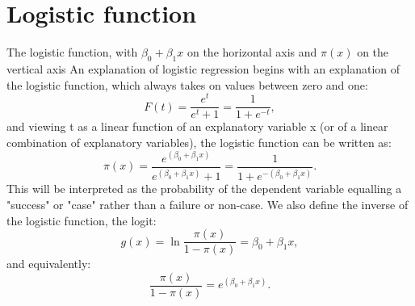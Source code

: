 \documentclass[a4paper,12pt]{article}
\begin{document}
\section*{Logistic function} 

The logistic function, with $\beta_0 + \beta_1 x$ on the horizontal axis and $\pi(x)$ on the vertical axis
An explanation of logistic regression begins with an explanation of the logistic function, which always takes on values between zero and one:
\[
F(t) = \frac{e^t}{e^t+1} = \frac{1}{1+e^{-t}},
\]
and viewing t as a linear function of an explanatory variable x (or of a linear combination of explanatory variables), the logistic function can be written as:
\[\pi(x) = \frac{e^{(\beta_0 + \beta_1 x)}} {e^{(\beta_0 + \beta_1 x)} + 1} = \frac {1} {1+e^{-(\beta_0 + \beta_1 x)}}.
\]
This will be interpreted as the probability of the dependent variable equalling a "success" or "case" rather than a failure or non-case. We also define the inverse of the logistic function, the logit:
\[g(x) = \ln \frac {\pi(x)} {1 - \pi(x)} = \beta_0 + \beta_1 x ,
\]and equivalently:
\[\frac{\pi(x)} {1 - \pi(x)} = e^{(\beta_0 + \beta_1 x)}.
\]
\end{document}
